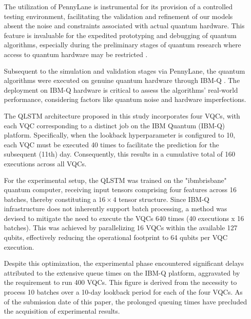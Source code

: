 The utilization of PennyLane is instrumental for its provision of a controlled testing environment, facilitating the validation and refinement of our models absent the noise and constraints associated with actual quantum hardware. This feature is invaluable for the expedited prototyping and debugging of quantum algorithms, especially during the preliminary stages of quantum research where access to quantum hardware may be restricted \cite{bergholm2022pennylane}.

Subsequent to the simulation and validation stages via PennyLane, the quantum algorithms were executed on genuine quantum hardware through IBM-Q \cite{IBMQuantum2023}. The deployment on IBM-Q hardware is critical to assess the algorithms' real-world performance, considering factors like quantum noise and hardware imperfections.

The QLSTM architecture proposed in this study incorporates four VQCs, with each VQC corresponding to a distinct job on the IBM Quantum (IBM-Q) platform. Specifically, when the lookback hyperparameter is configured to 10, each VQC must be executed 40 times to facilitate the prediction for the subsequent (11th) day. Consequently, this results in a cumulative total of 160 executions across all VQCs.

For the experimental setup, the QLSTM was trained on the "ibm\textunderscore brisbane" quantum computer, receiving input tensors comprising four features across 16 batches, thereby constituting a $16 \times 4$ tensor structure. Since IBM-Q infrastructure does not inherently support batch processing, a method was devised to mitigate the need to execute the VQCs 640 times (40 executions x 16 batches). This was achieved by parallelizing 16 VQCs within the available 127 qubits, effectively reducing the operational footprint to 64 qubits per VQC execution.

Despite this optimization, the experimental phase encountered significant delays attributed to the extensive queue times on the IBM-Q platform, aggravated by the requirement to run 400 VQCs. This figure is derived from the necessity to process 10 batches over a 10-day lookback period for each of the four VQCs. As of the submission date of this paper, the prolonged queuing times have precluded the acquisition of experimental results.